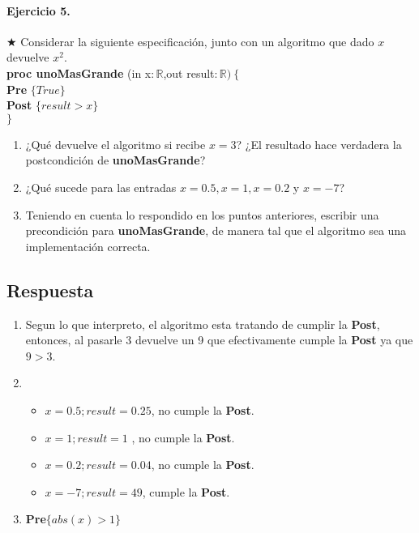 \documentclass[a4paper]{article}
\begin{document}
\paragraph*{Ejercicio 5.}$\bigstar$ Considerar la siguiente especificación, junto con un algoritmo que dado $x$ devuelve $x^2$.\medskip \\
		\textbf{proc unoMasGrande }(in x$: \mathbb{R}$,out result$:\mathbb{R})\ \{$\smallskip \\
		\hspace*{6mm} \textbf{Pre }$\{ True\}$\smallskip \\
		\hspace*{6mm} \textbf{Post }$\{result>x\}$\\
		$\}$
	\begin{enumerate}[label=\alph*)]
		\item ¿Qué devuelve el algoritmo si recibe $x=3$? ¿El resultado hace verdadera la postcondición de \textbf{unoMasGrande}?
		\item ¿Qué sucede para las entradas $x=0.5,x=1,x=0.2$ y $x=-7$?
		\item Teniendo en cuenta lo respondido en los puntos anteriores, escribir una precondición para \textbf{unoMasGrande}, de manera tal que el algoritmo sea una implementación correcta.
	\end{enumerate}
\subsection*{Respuesta}
	\begin{enumerate}[label=\alph*)]
		\item Segun lo que interpreto, el algoritmo esta tratando de cumplir la \textbf{Post}, entonces, al pasarle 3 devuelve un 9 que efectivamente cumple la \textbf{Post} ya que $9>3$. 
		\item 
			\begin{itemize}[label=$\cdot$]
			\item $x=0.5; result =0.25$, no cumple la \textbf{Post}.
			\item $x=1;   result =1$   , no cumple la \textbf{Post}.
			\item $x=0.2; result =0.04$, no cumple la \textbf{Post}.
			\item $x=-7;  result =49$,   cumple la \textbf{Post}.
			\end{itemize}
		\item \textbf{Pre}$\{ abs(x)>1\}$
	\end{enumerate}
	
\end{document}

